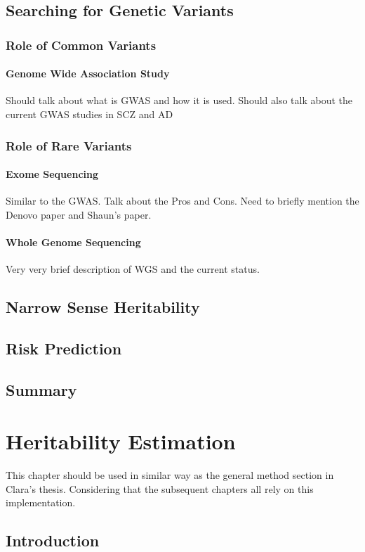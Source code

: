 \documentclass{book}
\begin{document}
	\section{Searching for Genetic Variants}
	\subsection{Role of Common Variants}
	\subsubsection{Genome Wide Association Study}
	Should talk about what is GWAS and how it is used.
	Should also talk about the current GWAS studies in SCZ and AD
	\subsection{Role of Rare Variants}
	\subsubsection{Exome Sequencing}
	Similar to the GWAS.
	Talk about the Pros and Cons.
	Need to briefly mention the Denovo paper and Shaun's paper.					
	\subsubsection{Whole Genome Sequencing}
	Very very brief description of WGS and the current status.
	\section{Narrow Sense Heritability}
	\section{Risk Prediction}
	\section{Summary}
	
	\chapter{Heritability Estimation}
	This chapter should be used in similar way as the general method section in Clara's thesis. Considering that the subsequent chapters all rely on this implementation.
	\section{Introduction}
\end{document}
